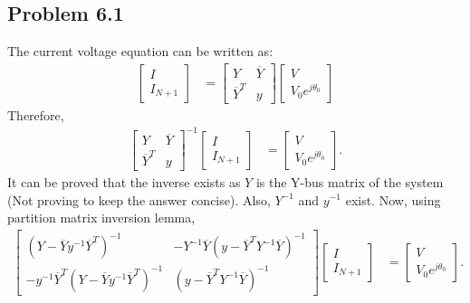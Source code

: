 \subsection*{Problem 6.1}
The current voltage equation can be written as:
\begin{align}\label{eq:q6_cur_vol}
	\begin{bmatrix}
		I\\I_{N+1}
	\end{bmatrix} &= \begin{bmatrix}
		Y & \overline{Y}\\
		\overline{Y}^T & y
	\end{bmatrix}\begin{bmatrix}
		V\\V_0e^{j\theta_0}
	\end{bmatrix}
\end{align}
Therefore,
\begin{align*}
	\begin{bmatrix}
		Y & \overline{Y}\\
		\overline{Y}^T & y
	\end{bmatrix}^{-1}\begin{bmatrix}
		I\\I_{N+1}
	\end{bmatrix} &= \begin{bmatrix}
		V\\V_0e^{j\theta_0}
	\end{bmatrix}.
\end{align*}
It can be proved that the inverse exists as $Y$ is the Y-bus matrix of the system (Not proving to keep the answer concise). Also, $Y^{-1}$ and $y^{-1}$ exist. Now, using partition matrix inversion lemma,
\begin{align*}
	\begin{bmatrix}
		(Y-\overline{Y}y^{-1}\overline{Y}^T)^{-1} & -Y^{-1}\overline{Y}(y-\overline{Y}^TY^{-1}\overline{Y})^{-1}\\
		-y^{-1}\overline{Y}^T(Y-\overline{Y}y^{-1}\overline{Y}^T)^{-1} & (y-\overline{Y}^TY^{-1}\overline{Y})^{-1}
	\end{bmatrix}\begin{bmatrix}
		I\\I_{N+1}
	\end{bmatrix} &= \begin{bmatrix}
		V\\V_0e^{j\theta_0}
	\end{bmatrix}.
\end{align*}
